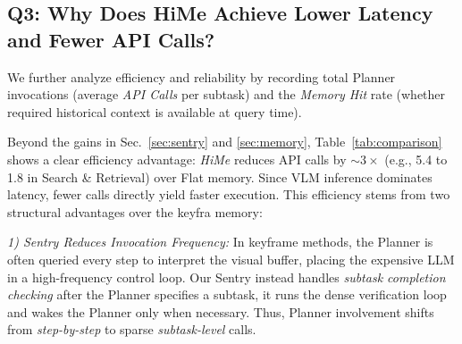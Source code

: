 \subsection{Q3: Why Does HiMe Achieve Lower Latency and Fewer API Calls?}
We further analyze efficiency and reliability by recording total Planner invocations (average \textit{API Calls} per subtask) and the \textit{Memory Hit} rate (whether required historical context is available at query time).

Beyond the gains in Sec.~\autoref{sec:sentry} and \autoref{sec:memory}, Table~\autoref{tab:comparison} shows a clear efficiency advantage: \textit{HiMe} reduces API calls by $\sim3\times$ (e.g., 5.4 to 1.8 in Search \& Retrieval) over Flat memory. Since VLM inference dominates latency, fewer calls directly yield faster execution. 
This efficiency stems from two structural advantages over the keyfra memory:

\textit{1) Sentry Reduces Invocation Frequency:}
In keyframe methods, the Planner is often queried every step to interpret the visual buffer, placing the expensive LLM in a high-frequency control loop. Our Sentry instead handles \textit{subtask completion checking} after the Planner specifies a subtask, it runs the dense verification loop and wakes the Planner only when necessary. Thus, Planner involvement shifts from \textit{step-by-step} to sparse \textit{subtask-level} calls.

